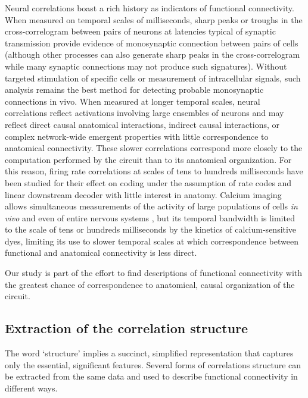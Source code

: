 \documentclass[10pt]{article}
\begin{document}
Neural correlations boast a rich history as indicators of functional connectivity. When measured on temporal scales of milliseconds, sharp peaks or troughs in the cross-correlogram between pairs of neurons at latencies typical of synaptic transmission provide evidence of monosynaptic connection between pairs of cells \cite{Moore:1970,Alonso:1998,Denman:2013} (although other processes can also generate sharp peaks in the cross-correlogram while many synaptic connections may not produce such signatures). Without targeted stimulation of specific cells or measurement of intracellular signals, such analysis remains the best method for detecting probable monosynaptic connections in vivo. When measured at longer temporal scales, neural correlations reflect activations involving large ensembles of neurons and may reflect direct causal anatomical interactions, indirect causal interactions, or complex network-wide emergent properties with little correspondence to anatomical connectivity. These slower correlations correspond more closely to the computation performed by the circuit than to its anatomical organization. For this reason, firing rate correlations at scales of tens to hundreds milliseconds have been studied for their effect on coding under the assumption of rate codes and linear downstream decoder \cite{Averbeck:2006} with little interest in anatomy. 
Calcium imaging allows simultaneous measurements of the activity of large populations of cells \emph{in vivo} \cite{Katona:2012,Cotton:2013} and even of entire nervous systems \cite{Leung:2013,Ahrens:2013}, but its temporal bandwidth is limited to the scale of tens or hundreds milliseconds by the kinetics of calcium-sensitive dyes, limiting its use to slower temporal scales at which correspondence between functional and anatomical connectivity is less direct.

Our study is part of the effort to find descriptions of functional connectivity with the greatest chance of correspondence to anatomical, causal organization of the circuit.

\subsection*{Extraction of the correlation structure}
The word `structure' implies a succinct, simplified representation that captures only the essential, significant features. Several forms of correlations structure can be extracted from the same data and used to describe functional connectivity in different ways.
\end{document}

